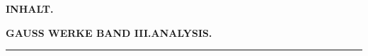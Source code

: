 \begingroup
\renewcommand{\arraystretch}{1.45}
\fancyhead[C]{}
\providecommand{\TStart}{\hspace*{.5em}}\providecommand{\TCont}{\hspace*{1em}}\providecommand{\TD}{\hspace{.3em}.\hspace{.3em}.}
\clearpage{}


\begin{center}
\textbf{INHALT.}\par
\medskip
\textbf{GAUSS WERKE BAND III.\quad ANALYSIS.}\par
\medskip
\rule{2em}{0.4pt}
\end{center}
\begingroup\small
\setlength{\tabcolsep}{0pt}
\setlength{\LTleft}{0pt}\setlength{\LTright}{0pt}
